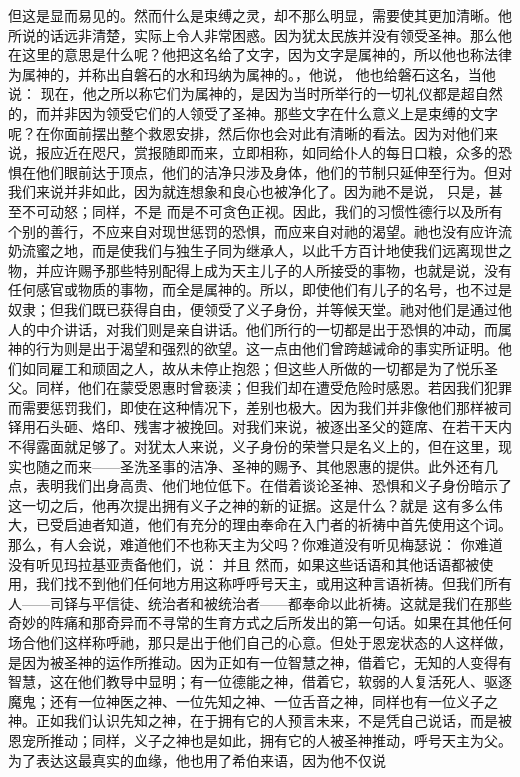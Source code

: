但这是显而易见的。然而什么是束缚之灵，却不那么明显，需要使其更加清晰。他所说的话远非清楚，实际上令人非常困惑。因为犹太民族并没有领受圣神。那么他在这里的意思是什么呢？他把这名给了文字，因为文字是属神的，所以他也称法律为属神的，并称出自磐石的水和玛纳为属神的。，他说， 他也给磐石这名，当他说： 现在，他之所以称它们为属神的，是因为当时所举行的一切礼仪都是超自然的，而并非因为领受它们的人领受了圣神。那些文字在什么意义上是束缚的文字呢？在你面前摆出整个救恩安排，然后你也会对此有清晰的看法。因为对他们来说，报应近在咫尺，赏报随即而来，立即相称，如同给仆人的每日口粮，众多的恐惧在他们眼前达于顶点，他们的洁净只涉及身体，他们的节制只延伸至行为。但对我们来说并非如此，因为就连想象和良心也被净化了。因为祂不是说， 只是，甚至不可动怒；同样，不是 而是不可贪色正视。因此，我们的习惯性德行以及所有个别的善行，不应来自对现世惩罚的恐惧，而应来自对祂的渴望。祂也没有应许流奶流蜜之地，而是使我们与独生子同为继承人，以此千方百计地使我们远离现世之物，并应许赐予那些特别配得上成为天主儿子的人所接受的事物，也就是说，没有任何感官或物质的事物，而全是属神的。所以，即使他们有儿子的名号，也不过是奴隶；但我们既已获得自由，便领受了义子身份，并等候天堂。祂对他们是通过他人的中介讲话，对我们则是亲自讲话。他们所行的一切都是出于恐惧的冲动，而属神的行为则是出于渴望和强烈的欲望。这一点由他们曾跨越诫命的事实所证明。他们如同雇工和顽固之人，故从未停止抱怨；但这些人所做的一切都是为了悦乐圣父。同样，他们在蒙受恩惠时曾亵渎；但我们却在遭受危险时感恩。若因我们犯罪而需要惩罚我们，即使在这种情况下，差别也极大。因为我们并非像他们那样被司铎用石头砸、烙印、残害才被挽回。对我们来说，被逐出圣父的筵席、在若干天内不得露面就足够了。对犹太人来说，义子身份的荣誉只是名义上的，但在这里，现实也随之而来——圣洗圣事的洁净、圣神的赐予、其他恩惠的提供。此外还有几点，表明我们出身高贵、他们地位低下。在借着谈论圣神、恐惧和义子身份暗示了这一切之后，他再次提出拥有义子之神的新的证据。这是什么？就是 这有多么伟大，已受启迪者知道，他们有充分的理由奉命在入门者的祈祷中首先使用这个词。那么，有人会说，难道他们不也称天主为父吗？你难道没有听见梅瑟说： 你难道没有听见玛拉基亚责备他们，说： 并且 然而，如果这些话语和其他话语都被使用，我们找不到他们任何地方用这称呼呼号天主，或用这种言语祈祷。但我们所有人——司铎与平信徒、统治者和被统治者——都奉命以此祈祷。这就是我们在那些奇妙的阵痛和那奇异而不寻常的生育方式之后所发出的第一句话。如果在其他任何场合他们这样称呼祂，那只是出于他们自己的心意。但处于恩宠状态的人这样做，是因为被圣神的运作所推动。因为正如有一位智慧之神，借着它，无知的人变得有智慧，这在他们教导中显明；有一位德能之神，借着它，软弱的人复活死人、驱逐魔鬼；还有一位神医之神、一位先知之神、一位舌音之神，同样也有一位义子之神。正如我们认识先知之神，在于拥有它的人预言未来，不是凭自己说话，而是被恩宠所推动；同样，义子之神也是如此，拥有它的人被圣神推动，呼号天主为父。为了表达这最真实的血缘，他也用了希伯来语，因为他不仅说 